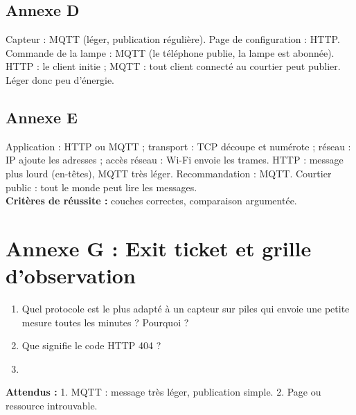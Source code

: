 \documentclass[11pt,a4paper]{article}
\begin{document}
\subsection*{Annexe D}
Capteur : MQTT (léger, publication régulière). Page de configuration : HTTP. Commande de la lampe : MQTT (le téléphone publie, la lampe est abonnée). HTTP : le client initie ; MQTT : tout client connecté au courtier peut publier. Léger donc peu d'énergie.

\subsection*{Annexe E}
Application : HTTP ou MQTT ; transport : TCP découpe et numérote ; réseau : IP ajoute les adresses ; accès réseau : Wi-Fi envoie les trames. HTTP : message plus lourd (en-têtes), MQTT très léger. Recommandation : MQTT. Courtier public : tout le monde peut lire les messages.\\
\textbf{Critères de réussite :} couches correctes, comparaison argumentée.

\newpage
\section*{Annexe G : Exit ticket et grille d'observation}

\begin{enumerate}
 \item Quel protocole est le plus adapté à un capteur sur piles qui envoie une petite mesure toutes les minutes ? Pourquoi ?\\ \lig
 \item Que signifie le code HTTP 404 ?\\ \lig
 \item \autoeval
\end{enumerate}
\textbf{Attendus :} 1. MQTT : message très léger, publication simple. 2. Page ou ressource introuvable.

\bigskip
{}
\end{document}
